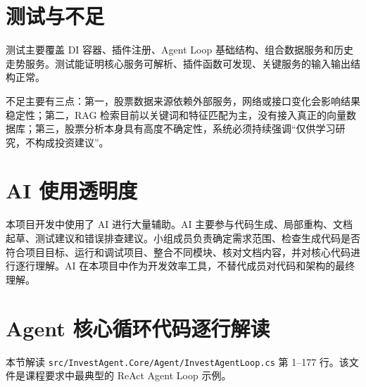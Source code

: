 \documentclass[UTF8,a4paper,11pt]{ctexart}
\begin{document}
\section{测试与不足}
测试主要覆盖 DI 容器、插件注册、Agent Loop 基础结构、组合数据服务和历史走势服务。测试能证明核心服务可解析、插件函数可发现、关键服务的输入输出结构正常。

不足主要有三点：第一，股票数据来源依赖外部服务，网络或接口变化会影响结果稳定性；第二，RAG 检索目前以关键词和特征匹配为主，没有接入真正的向量数据库；第三，股票分析本身具有高度不确定性，系统必须持续强调“仅供学习研究，不构成投资建议”。

\section{AI 使用透明度}
本项目开发中使用了 AI 进行大量辅助。AI 主要参与代码生成、局部重构、文档起草、测试建议和错误排查建议。小组成员负责确定需求范围、检查生成代码是否符合项目目标、运行和调试项目、整合不同模块、核对文档内容，并对核心代码进行逐行理解。AI 在本项目中作为开发效率工具，不替代成员对代码和架构的最终理解。

\section{Agent 核心循环代码逐行解读}
本节解读 \texttt{src/InvestAgent.Core/Agent/InvestAgentLoop.cs} 第 1--177 行。该文件是课程要求中最典型的 ReAct Agent Loop 示例。
\end{document}
